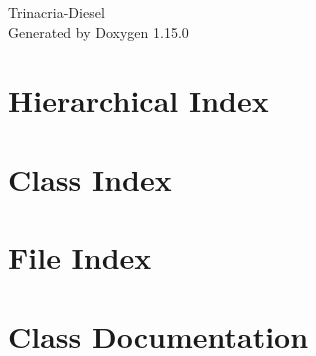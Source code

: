 \documentclass[twoside]{book}
\newcommand{\+}{\discretionary{\mbox{\scriptsize$\hookleftarrow$}}{}{}}
\newcommand{\clearemptydoublepage}{%
    \newpage{\pagestyle{empty}\cleardoublepage}%
  }
\begin{document}
  \raggedbottom
    \hypersetup{pageanchor=false,
                bookmarksnumbered=true,
                pdfencoding=unicode
               }
  \begin{titlepage}
  \vspace*{7cm}
  \begin{center}%
  {\Large Trinacria-\/\+Diesel}\\
  \vspace*{1cm}
  {\large Generated by Doxygen 1.15.0}\\
  \end{center}
  \end{titlepage}
  \clearemptydoublepage
  \tableofcontents
  \clearemptydoublepage
  \hypersetup{pageanchor=true}
\chapter{Hierarchical Index}

\chapter{Class Index}

\chapter{File Index}

\chapter{Class Documentation}




























\end{document}
